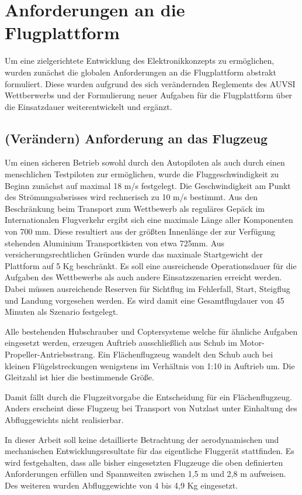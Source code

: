 \chapter{Anforderungen an die Flugplattform}\label{cha:Anforderungen an die Flugplattform}

Um eine zielgerichtete Entwicklung des Elektronikkonzepts zu ermöglichen, wurden zunächst die globalen Anforderungen an die Flugplattform abstrakt formuliert. Diese wurden aufgrund des sich verändernden Reglements des AUVSI Wettberwerbs und der Formulierung neuer Aufgaben für die Flugplattform über die Einsatzdauer weiterentwickelt und ergänzt.  


\section{(Verändern) Anforderung an das Flugzeug}

Um einen sicheren Betrieb sowohl durch den Autopiloten als auch durch einen menschlichen Testpiloten zur ermöglichen,
wurde die Fluggeschwindigkeit zu Beginn zunächst auf maximal 18 m/s festgelegt. Die Geschwindigkeit am Punkt des Strömungsabsrisses wird rechnerisch zu 10 m/s bestimmt.
Aus den Beschränkung beim Transport zum Wettbewerb als reguläres Gepäck im Internationalen Flugverkehr ergibt sich eine maximale Länge aller Komponenten von 700 mm. Diese resultiert aus der größten Innenlänge der zur Verfügung stehenden Aluminium Transportkisten von etwa 725mm.
Aus versicherungsrechtlichen Gründen wurde das maximale Startgewicht der Plattform auf 5 Kg beschränkt.
Es soll eine ausreichende Operationsdauer für die Aufgaben des Wettbewerbs als auch andere Einsatzszenarien erreicht werden. Dabei müssen ausreichende Reserven für Sichtflug im Fehlerfall, Start, Steigflug und Landung vorgesehen werden.
Es wird damit eine Gesamtflugdauer von 45 Minuten als Szenario festgelegt.

Alle bestehenden Hubschrauber und Coptersysteme welche für ähnliche Aufgaben eingesetzt werden, erzeugen Auftrieb ausschließlich aus Schub im Motor-Propeller-Antriebsstrang. Ein Flächenflugzeug wandelt den Schub auch bei kleinen Flügelstreckungen wenigstens im Verhältnis von 1:10 in Auftrieb um. Die Gleitzahl ist hier die bestimmende Größe.

Damit fällt durch die Flugzeitvorgabe die Entscheidung für ein Flächenflugzeug. Anders erscheint diese Flugzeug bei Transport von Nutzlast unter Einhaltung des Abfluggewichts nicht realisierbar.

In dieser Arbeit soll keine detaillierte Betrachtung der aerodynamischen und mechanischen Entwicklungsresultate für das eigentliche Fluggerät stattfinden. Es wird festgehalten, dass alle bisher eingesetzten Flugzeuge die oben definierten Anforderungen erfüllen und Spannweiten zwischen 1,5 m und 2,8 m aufweisen. Des weiteren wurden Abfluggewichte von 4 bis 4,9 Kg eingesetzt.


